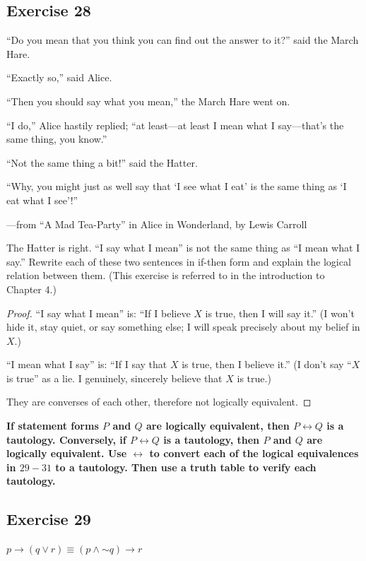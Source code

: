 \documentclass[14pt]{extarticle}
\newcommand{\bic}{\leftrightarrow}
\begin{document}
\subsection{Exercise 28}
“Do you mean that you think you can find out the answer to it?” said the March
Hare.

“Exactly so,” said Alice.

“Then you should say what you mean,” the March Hare went on.

“I do,” Alice hastily replied; “at least—at least I mean what I say—that’s the
same thing, you know.”

“Not the same thing a bit!” said the Hatter.

“Why, you might just as well say that ‘I see what I eat’ is the same thing as ‘I
eat what I see’!”

—from “A Mad Tea-Party” in Alice in Wonderland, by Lewis Carroll

The Hatter is right. “I say what I mean” is not the same thing as “I mean what I
say.” Rewrite each of these two sentences in if-then form and explain the
logical relation between them. (This exercise is referred to in the introduction
to Chapter 4.)

\begin{proof}
“I say what I mean” is: ``If I believe $X$ is true, then I will say it.'' (I
won't hide it, stay quiet, or say something else; I will speak precisely about
my belief in $X$.)

“I mean what I say” is: ``If I say that $X$ is true, then I believe it.'' (I
don't say ``$X$ is true'' as a lie. I genuinely, sincerely believe that $X$ is
true.)

They are converses of each other, therefore not logically equivalent.
\end{proof}

{\bf If statement forms $P$ and $Q$ are logically equivalent, then $P \bic Q$ is
a tautology. Conversely, if $P \bic Q$ is a tautology, then $P$ and $Q$ are
logically equivalent. Use $\bic$ to convert each of the logical equivalences in
$29-31$ to a tautology. Then use a truth table to verify each tautology.}

\subsection{Exercise 29}
$p \to (q \vee r) \equiv (p \wedge {\sim q}) \to r$
\end{document}

